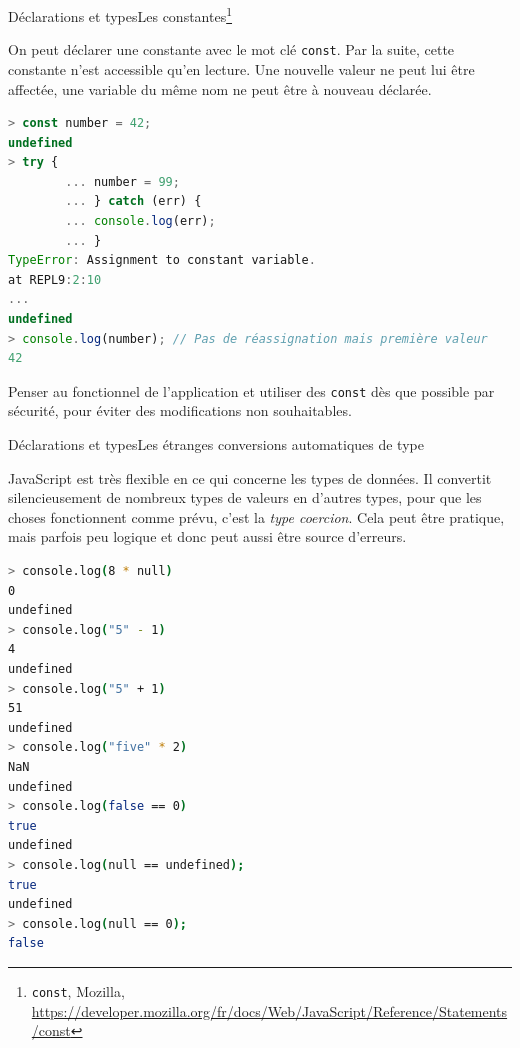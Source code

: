 \documentclass{beamer}
\begin{document}
\begin{frame}[fragile]{Déclarations et types}{Les constantes\footnote{\lstinline{const}, Mozilla, \url{https://developer.mozilla.org/fr/docs/Web/JavaScript/Reference/Statements/const}}}
    \begin{footnotesize}
        On peut déclarer une constante avec le mot clé \lstinline{const}.
        Par la suite, cette constante n'est accessible qu'en lecture.
        Une nouvelle valeur ne peut lui être affectée, une variable du même nom ne peut être à nouveau déclarée.
        \begin{lstlisting}[language=JavaScript,title={\scriptsize{Script JavaScript}},basicstyle=\tiny\ttfamily]
> const number = 42;
undefined
> try {
        ... number = 99;
        ... } catch (err) {
        ... console.log(err);
        ... }
TypeError: Assignment to constant variable.
at REPL9:2:10
...
undefined
> console.log(number); // Pas de réassignation mais première valeur
42
        \end{lstlisting}
        \begin{dangercolorbox}
            Penser au fonctionnel de l'application et utiliser des \lstinline{const} dès que possible par sécurité, pour éviter des modifications non souhaitables.
        \end{dangercolorbox}
    \end{footnotesize}
\end{frame}

\begin{frame}[fragile]{Déclarations et types}{Les étranges conversions automatiques de type}
    \begin{footnotesize}
        JavaScript est très flexible en ce qui concerne les types de données.
        Il convertit silencieusement de nombreux types de valeurs en d'autres types, pour que les choses fonctionnent comme prévu, c'est la \textit{type coercion}.
        Cela peut être pratique, mais parfois peu logique et donc peut aussi être source d'erreurs.
    \end{footnotesize}
    \begin{lstlisting}[language=Bash,title={\scriptsize{Node.js}},basicstyle=\tiny\ttfamily]
> console.log(8 * null)
0
undefined
> console.log("5" - 1)
4
undefined
> console.log("5" + 1)
51
undefined
> console.log("five" * 2)
NaN
undefined
> console.log(false == 0)
true
undefined
> console.log(null == undefined);
true
undefined
> console.log(null == 0);
false
        \end{lstlisting}
\end{frame}
\end{document}
